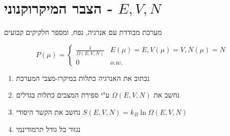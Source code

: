 \section{הצבר המיקרוקנוני - $E,V,N$}
מערכת מבודדת עם אנרגיה, נפח, ומספר חלקיקים קבועים 
 \begin{cheatformula}
 $$
 P \left(\mu\right) = \begin{cases}
     \frac{1}{\Omega \left( E,V,N \right)} & E\left(\mu\right)=E, V\left(\mu\right)=V,N\left(\mu\right)=N\\
     0 & o.w.
 \end{cases}
 $$
\end{cheatformula}

\begin{cheatformula}
\begin{enumerate}
        \item נכתוב את האנרגיה כתלות במיקרו-מצבי המערכת
        \item נחשב את $\Omega \left( E,V,N \right)$ ע"י ספירת המצבים כתלות בגדלים
        \item נחשב את הקשר היסודי $S\left( E,V,N \right) = k_B \ln \Omega \left( E,V,N \right)$
        \item נגזור כל גודל תרמודינמי 
\end{enumerate}
\end{cheatformula}
